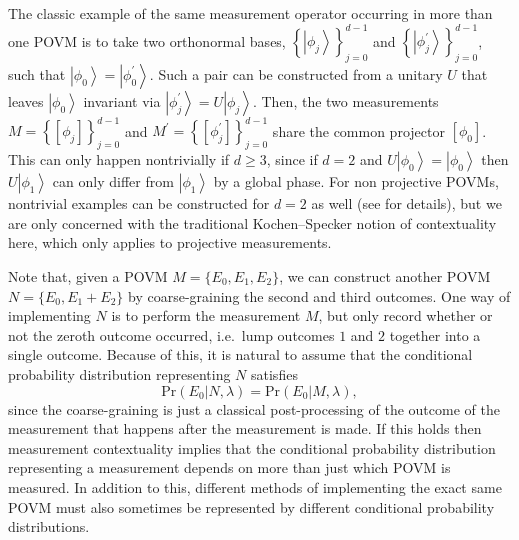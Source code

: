\documentclass[DIV=calc,fontsize=12pt]{scrartcl} %
\theoremstyle{definition}
\theoremstyle{plain}
\newcommand{\Ket}[1]{\ensuremath{\left \vert #1 \right \rangle}}
\newcommand{\Proj}[1]{\ensuremath{\left [ #1 \right ]}}
\begin{document}
The classic example of the same measurement operator occurring in more
than one POVM is to take two orthonormal bases, $\left \{\Ket{\phi_j}
\right \}_{j=0}^{d-1}$ and $\left \{ \Ket{\phi^{\prime}_j} \right
\}_{j=0}^{d-1}$, such that $\Ket{\phi_0} = \Ket{\phi^{\prime}_0}$.
Such a pair can be constructed from a unitary $U$ that leaves
$\Ket{\phi_0}$ invariant via $\Ket{\phi^{\prime}_j} = U \Ket{\phi_j}$.
Then, the two measurements $M = \left \{ \Proj{\phi_j}\right
\}_{j=0}^{d-1}$ and $M^{\prime} = \left \{
\Proj{\phi^{\prime}_j}\right \}_{j=0}^{d-1}$ share the common
projector $\Proj{\phi_0}$.  This can only happen nontrivially if $d
\geq 3$, since if $d=2$ and $U \Ket{\phi_0} = \Ket{\phi_0}$ then
$U\Ket{\phi_1}$ can only differ from $\Ket{\phi_1}$ by a global phase.
For non projective POVMs, nontrivial examples can be constructed for
$d=2$ as well (see \cite{Spekkens2005} for details), but we are only
concerned with the traditional Kochen--Specker notion of contextuality
here, which only applies to projective measurements.

Note that, given a POVM $M = \{E_0,E_1,E_2\}$, we can construct another
POVM $N = \{E_0,E_1 + E_2\}$ by coarse-graining the second and third
outcomes.  One way of implementing $N$ is to perform the measurement
$M$, but only record whether or not the zeroth outcome occurred,
i.e.\ lump outcomes $1$ and $2$ together into a single outcome.
Because of this, it is natural to assume that the conditional
probability distribution representing $N$ satisfies
\begin{equation}
\text{Pr}(E_0|N,\lambda) = \text{Pr}(E_0|M,\lambda),
\end{equation}
since the coarse-graining is just a classical post-processing of the
outcome of the measurement that happens after the measurement is made.
If this holds then measurement contextuality implies that the
conditional probability distribution representing a measurement
depends on more than just which POVM is measured.  In addition to
this, different methods of implementing the exact same POVM must also
sometimes be represented by different conditional probability
distributions.
\end{document}
